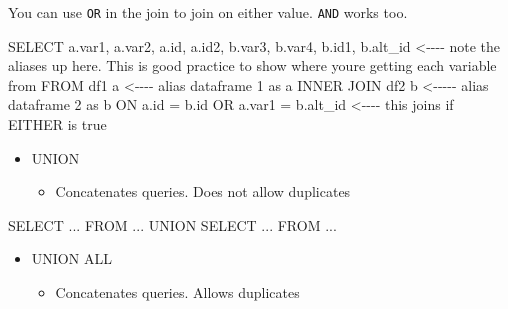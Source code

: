 \documentclass[
  letterpaper,
  DIV=11,
  numbers=noendperiod]{scrreprt}
\newenvironment{Shaded}{\begin{snugshade}}{\end{snugshade}}
\newcommand{\CommentTok}[1]{\textcolor[rgb]{0.37,0.37,0.37}{#1}}
\newcommand{\KeywordTok}[1]{\textcolor[rgb]{0.00,0.23,0.31}{#1}}
\newcommand{\NormalTok}[1]{\textcolor[rgb]{0.00,0.23,0.31}{#1}}
\newcommand{\OperatorTok}[1]{\textcolor[rgb]{0.37,0.37,0.37}{#1}}
\providecommand{\tightlist}{%
  \setlength{\itemsep}{0pt}\setlength{\parskip}{0pt}}\usepackage{longtable,booktabs,array}
\begin{document}
You can use \texttt{OR} in the join to join on either value.
\texttt{AND} works too.

\begin{Shaded}
\begin{Highlighting}[]
\KeywordTok{SELECT}\NormalTok{ a.var1, a.var2, a.}\KeywordTok{id}\NormalTok{, a.id2, b.var3, b.var4, b.id1, b.alt\_id }\OperatorTok{\textless{}}\CommentTok{{-}{-}{-}{-} note the aliases up here.  This is good practice to show where you\textquotesingle{}re getting each variable from}
\KeywordTok{FROM}\NormalTok{ df1 a }\OperatorTok{\textless{}}\CommentTok{{-}{-}{-}{-} alias dataframe 1 as a}
\KeywordTok{INNER} \KeywordTok{JOIN}\NormalTok{ df2 b }\OperatorTok{\textless{}}\CommentTok{{-}{-}{-}{-}{-} alias dataframe 2 as b}
\KeywordTok{ON}\NormalTok{ a.}\KeywordTok{id} \OperatorTok{=}\NormalTok{ b.}\KeywordTok{id} \KeywordTok{OR}\NormalTok{ a.var1 }\OperatorTok{=}\NormalTok{ b.alt\_id }\OperatorTok{\textless{}}\CommentTok{{-}{-}{-}{-} this joins if EITHER is true}
\end{Highlighting}
\end{Shaded}

\begin{itemize}
\tightlist
\item
  UNION

  \begin{itemize}
  \tightlist
  \item
    Concatenates queries. Does not allow duplicates
  \end{itemize}
\end{itemize}

\begin{Shaded}
\begin{Highlighting}[]
\KeywordTok{SELECT} \OperatorTok{..}\NormalTok{.}
\KeywordTok{FROM} \OperatorTok{..}\NormalTok{.}
\KeywordTok{UNION}
\KeywordTok{SELECT} \OperatorTok{..}\NormalTok{.}
\KeywordTok{FROM} \OperatorTok{..}\NormalTok{.}
\end{Highlighting}
\end{Shaded}

\begin{itemize}
\tightlist
\item
  UNION ALL

  \begin{itemize}
  \tightlist
  \item
    Concatenates queries. Allows duplicates
  \end{itemize}
\end{itemize}
\end{document}
